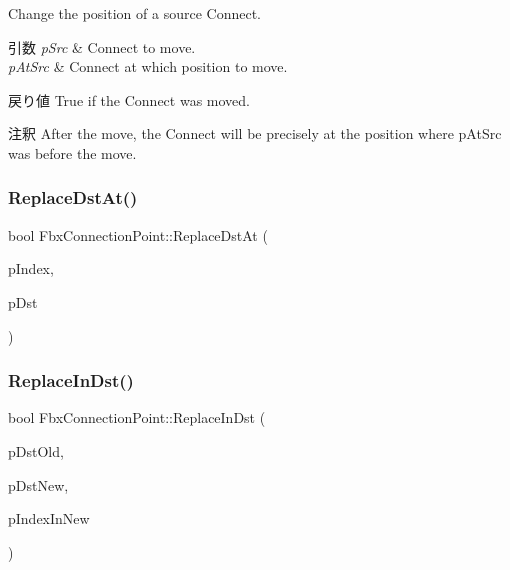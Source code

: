 Change the position of a source Connect. 
\begin{DoxyParams}{引数}
{\em p\+Src} & Connect to move. \\
\hline
{\em p\+At\+Src} & Connect at which position to move. \\
\hline
\end{DoxyParams}
\begin{DoxyReturn}{戻り値}
{\ttfamily True} if the Connect was moved. 
\end{DoxyReturn}
\begin{DoxyRemark}{注釈}
After the move, the Connect will be precisely at the position where p\+At\+Src was before the move. 
\end{DoxyRemark}
\mbox{\label{class_fbx_connection_point_ad7a2a088589958e0f7d85eb39c1fc173}} 
\subsubsection{\texorpdfstring{Replace\+Dst\+At()}{ReplaceDstAt()}}
{\footnotesize\ttfamily bool Fbx\+Connection\+Point\+::\+Replace\+Dst\+At (\begin{DoxyParamCaption}\item[{int}]{p\+Index,  }\item[{\hyperlink{class_fbx_connection_point}{Fbx\+Connection\+Point} $\ast$}]{p\+Dst }\end{DoxyParamCaption})}

\mbox{\label{class_fbx_connection_point_ae1d8edf287d969906c1dd1cc4e666df9}} 
\subsubsection{\texorpdfstring{Replace\+In\+Dst()}{ReplaceInDst()}}
{\footnotesize\ttfamily bool Fbx\+Connection\+Point\+::\+Replace\+In\+Dst (\begin{DoxyParamCaption}\item[{\hyperlink{class_fbx_connection_point}{Fbx\+Connection\+Point} $\ast$}]{p\+Dst\+Old,  }\item[{\hyperlink{class_fbx_connection_point}{Fbx\+Connection\+Point} $\ast$}]{p\+Dst\+New,  }\item[{int}]{p\+Index\+In\+New }\end{DoxyParamCaption})}


